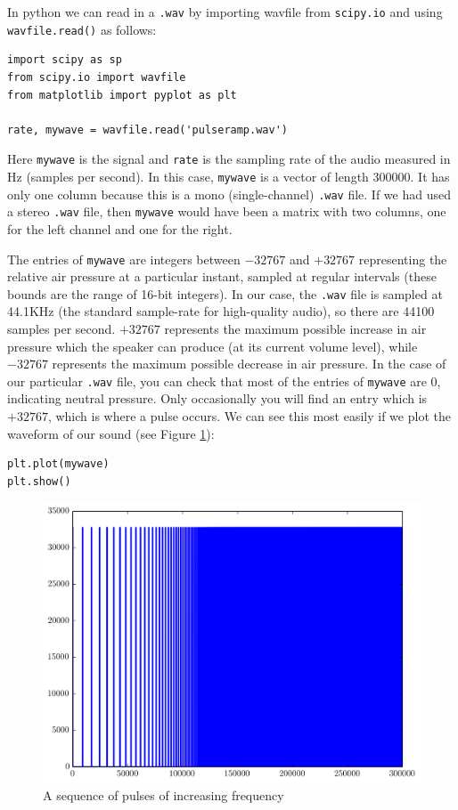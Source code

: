In python we can read in a \texttt{.wav} by importing wavfile from \texttt{scipy.io} and using \texttt{wavfile.read()} as follows:
\begin{lstlisting}
import scipy as sp
from scipy.io import wavfile
from matplotlib import pyplot as plt

rate, mywave = wavfile.read('pulseramp.wav')
\end{lstlisting}

Here \texttt{mywave} is the signal and \texttt{rate} is the sampling rate of the audio measured in Hz (samples per second).
In this case, \texttt{mywave} is a vector of length $300000$.
It has only one column because this is a mono (single-channel) \texttt{.wav} file.
If we had used a stereo \texttt{.wav} file, then \texttt{mywave} would have been a matrix with two columns, one for the left channel and one for the right.

The entries of \texttt{mywave} are integers between $-32767$ and $+32767$ representing the relative air pressure at a particular instant, sampled at regular intervals (these bounds are the range of 16-bit integers).
In our case, the \texttt{.wav} file is sampled at 44.1KHz (the standard sample-rate for high-quality audio), so there are 44100 samples per second. 
$+32767$ represents the maximum possible increase in air pressure which the speaker can produce (at its current volume level), while $-32767$ represents the maximum possible decrease in air pressure.
In the case of our particular \texttt{.wav} file, you can check that most of the entries of \texttt{mywave} are $0$, indicating neutral pressure. 
Only occasionally you will find an entry which is $+32767$, which is where a pulse occurs.
We can see this most easily if we plot the waveform of our sound (see Figure \ref{pulseramp}):
\begin{lstlisting}
plt.plot(mywave)
plt.show()
\end{lstlisting}
\begin{figure}[ht]\caption{A sequence of pulses of increasing frequency}\label{pulseramp}\centering\includegraphics[width=\textwidth]{pulseramp}\end{figure}

